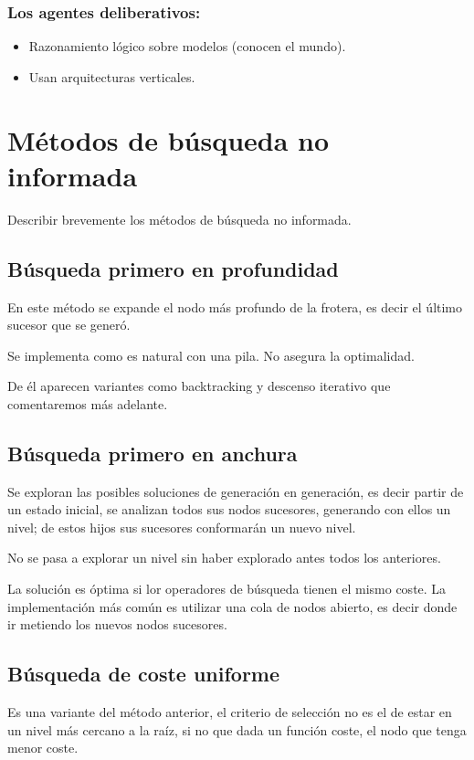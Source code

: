 \documentclass[12 pt, a4paper]{article}
\begin{document}
\subsubsection*{Los agentes deliberativos: }

\begin{itemize}
  \item Razonamiento lógico sobre modelos (conocen el mundo).
  \item Usan arquitecturas verticales.
\end{itemize}

\newpage


\section{Métodos de búsqueda no informada}  
 Describir brevemente los métodos de búsqueda no informada.
 \subsection{Búsqueda primero en profundidad}  
 En este método se expande el nodo más profundo de la frotera, es decir el último sucesor que se generó.
 
 Se implementa como es natural con una pila. No asegura la optimalidad. 
 
 De él aparecen variantes como backtracking y descenso iterativo que comentaremos más adelante.

 
\subsection{Búsqueda primero en anchura}
Se exploran las posibles soluciones de generación en generación, es decir
 partir de un estado inicial, se analizan todos sus nodos sucesores, generando con ellos un nivel; 
 de estos hijos sus sucesores conformarán un nuevo nivel. 

 No se pasa a explorar un nivel sin haber explorado antes todos los anteriores. 

 La solución es óptima si lor operadores de búsqueda tienen el mismo coste. 
 La implementación más común es utilizar una cola de nodos abierto, es decir donde ir metiendo
 los nuevos nodos sucesores. 


 \subsection{Búsqueda de coste uniforme}

 Es una variante del método anterior, el criterio de selección no es el de estar
 en un nivel más cercano a la raíz, si no que dada un función coste, el nodo que tenga menor coste. 
\end{document}
